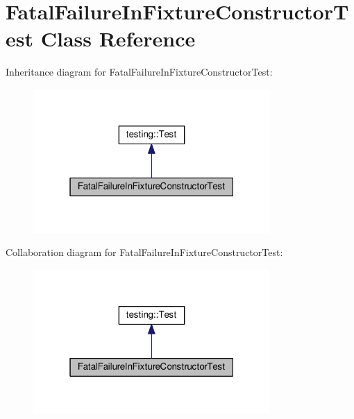 \hypertarget{classFatalFailureInFixtureConstructorTest}{}\section{Fatal\+Failure\+In\+Fixture\+Constructor\+Test Class Reference}
\label{classFatalFailureInFixtureConstructorTest}


Inheritance diagram for Fatal\+Failure\+In\+Fixture\+Constructor\+Test\+:\nopagebreak
\begin{figure}[H]
\begin{center}
\leavevmode
\includegraphics[width=256pt]{classFatalFailureInFixtureConstructorTest__inherit__graph}
\end{center}
\end{figure}


Collaboration diagram for Fatal\+Failure\+In\+Fixture\+Constructor\+Test\+:\nopagebreak
\begin{figure}[H]
\begin{center}
\leavevmode
\includegraphics[width=256pt]{classFatalFailureInFixtureConstructorTest__coll__graph}
\end{center}
\end{figure}

